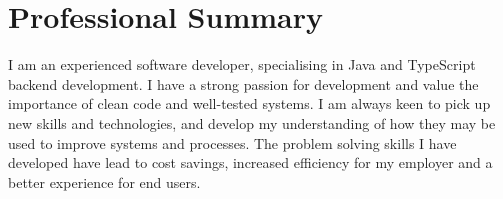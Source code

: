 \section{Professional Summary}\label{sec:professional-summary}
I am an experienced software developer, specialising in Java and TypeScript backend development.
I have a strong passion for development and value the importance of clean code and well-tested systems.
I am always keen to pick up new skills and technologies, and develop my understanding of how they may be used to improve systems and processes.
The problem solving skills I have developed have lead to cost savings, increased efficiency for my employer and a better experience for end users.